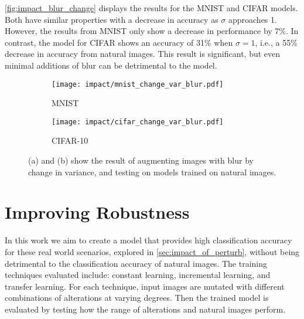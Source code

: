 \documentclass[conference]{IEEEtran}
\begin{document}
\autoref{fig:impact_blur_change} displays the results for the MNIST and CIFAR models. Both have similar properties with a decrease in accuracy as $\sigma$ approaches 1. However, the results from MNIST only show a decrease in performance by 7\%. In contrast, the model for CIFAR shows an accuracy of 31\% when $\sigma=1$, i.e., a 55\% decrease in accuracy from natural images. This result is significant, but even minimal additions of blur can be detrimental to the model.

\begin{figure}[H]
    \centering
    \begin{subfigure}{0.45\columnwidth}
        \centering
        \texttt{[image: impact/mnist\_change\_var\_blur.pdf]}
        \caption{MNIST}
    \end{subfigure}
    \begin{subfigure}{0.45\columnwidth}
        \centering
        \texttt{[image: impact/cifar\_change\_var\_blur.pdf]}
        \caption{CIFAR-10}
    \end{subfigure}
    \captionsetup{width=0.90\columnwidth}
    \caption{(a) and (b) show the result of augmenting images with blur by change in variance, and testing on models trained on natural images.}
    \label{fig:impact_blur_change}
\end{figure}

\section{Improving Robustness}
\label{sec:improving_robustness}

In this work we aim to create a model that provides high classification accuracy for these real world scenarios, explored in \autoref{sec:impact_of_perturb}, without being detrimental to the classification accuracy of natural images. The training techniques evaluated include: constant learning, incremental learning, and transfer learning. For each technique, input images are mutated with different combinations of alterations at varying degrees. Then the trained model is evaluated by testing how the range of alterations and natural images perform.
\end{document}
